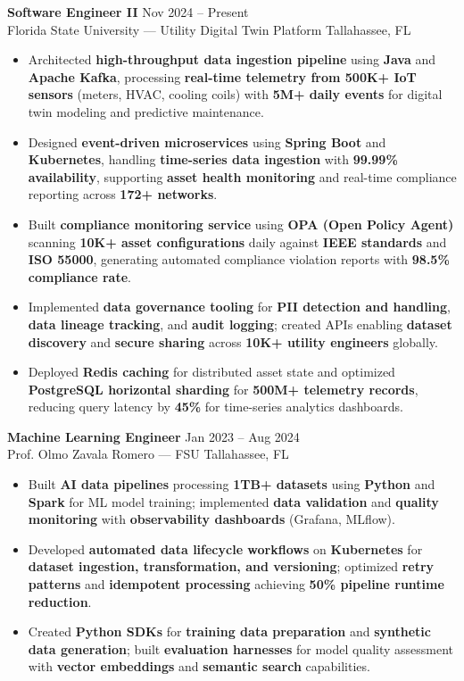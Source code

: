 \documentclass[letterpaper,10pt]{article}
\newcommand{\resumeItem}[1]{\item\small #1}
\newcommand{\resumeSubheading}[4]{
  \vspace{6pt}
  \noindent
  \textbf{#1} \hfill {\footnotesize #2} \\
  [-1pt]
  \noindent
  \small #3 \hfill {\small #4}
  \vspace{3pt}
}
\newcommand{\resumeItemsStart}{\vspace{-2pt}\begin{itemize}}
\newcommand{\resumeItemsEnd}{\end{itemize}\vspace{6pt}}
\begin{document}
\resumeSubheading
{Software Engineer II}{Nov 2024 -- Present}
{Florida State University — Utility Digital Twin Platform}{Tallahassee, FL}
\resumeItemsStart
\resumeItem{Architected \textbf{high-throughput data ingestion pipeline} using \textbf{Java} and \textbf{Apache Kafka}, processing \textbf{real-time telemetry from 500K+ IoT sensors} (meters, HVAC, cooling coils) with \textbf{5M+ daily events} for digital twin modeling and predictive maintenance.}
\resumeItem{Designed \textbf{event-driven microservices} using \textbf{Spring Boot} and \textbf{Kubernetes}, handling \textbf{time-series data ingestion} with \textbf{99.99\% availability}, supporting \textbf{asset health monitoring} and real-time compliance reporting across \textbf{172+ networks}.}
\resumeItem{Built \textbf{compliance monitoring service} using \textbf{OPA (Open Policy Agent)} scanning \textbf{10K+ asset configurations} daily against \textbf{IEEE standards} and \textbf{ISO 55000}, generating automated compliance violation reports with \textbf{98.5\% compliance rate}.}
\resumeItem{Implemented \textbf{data governance tooling} for \textbf{PII detection and handling}, \textbf{data lineage tracking}, and \textbf{audit logging}; created APIs enabling \textbf{dataset discovery} and \textbf{secure sharing} across \textbf{10K+ utility engineers} globally.}
\resumeItem{Deployed \textbf{Redis caching} for distributed asset state and optimized \textbf{PostgreSQL horizontal sharding} for \textbf{500M+ telemetry records}, reducing query latency by \textbf{45\%} for time-series analytics dashboards.}
\resumeItemsEnd
\vspace{-12pt}

\resumeSubheading
{Machine Learning Engineer}{Jan 2023 -- Aug 2024}
{Prof. Olmo Zavala Romero — FSU}{Tallahassee, FL}
\resumeItemsStart
\resumeItem{Built \textbf{AI data pipelines} processing \textbf{1TB+ datasets} using \textbf{Python} and \textbf{Spark} for ML model training; implemented \textbf{data validation} and \textbf{quality monitoring} with \textbf{observability dashboards} (Grafana, MLflow).}
\resumeItem{Developed \textbf{automated data lifecycle workflows} on \textbf{Kubernetes} for \textbf{dataset ingestion, transformation, and versioning}; optimized \textbf{retry patterns} and \textbf{idempotent processing} achieving \textbf{50\% pipeline runtime reduction}.}
\resumeItem{Created \textbf{Python SDKs} for \textbf{training data preparation} and \textbf{synthetic data generation}; built \textbf{evaluation harnesses} for model quality assessment with \textbf{vector embeddings} and \textbf{semantic search} capabilities.}
\resumeItemsEnd
\vspace{-12pt}
\end{document}
